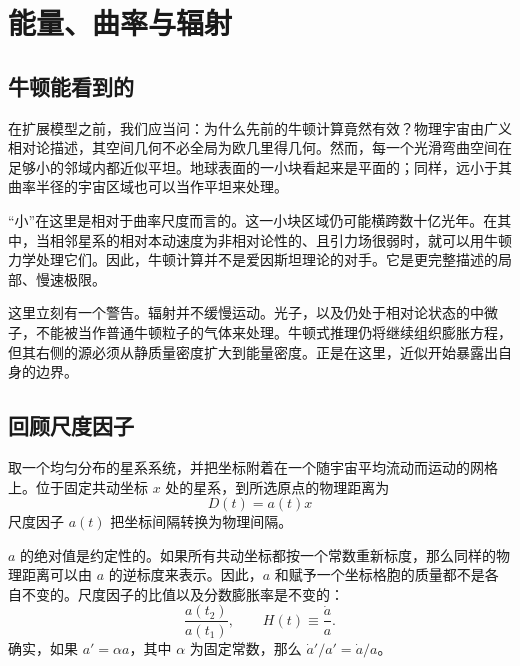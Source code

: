 \chapter{能量、曲率与辐射}


\section{牛顿能看到的}

在扩展模型之前，我们应当问：为什么先前的牛顿计算竟然有效？物理宇宙由广义相对论描述，其空间几何不必全局为欧几里得几何。然而，每一个光滑弯曲空间在足够小的邻域内都近似平坦。地球表面的一小块看起来是平面的；同样，远小于其曲率半径的宇宙区域也可以当作平坦来处理。

``小''在这里是相对于曲率尺度而言的。这一小块区域仍可能横跨数十亿光年。在其中，当相邻星系的相对本动速度为非相对论性的、且引力场很弱时，就可以用牛顿力学处理它们。因此，牛顿计算并不是爱因斯坦理论的对手。它是更完整描述的局部、慢速极限。

这里立刻有一个警告。辐射并不缓慢运动。光子，以及仍处于相对论状态的中微子，不能被当作普通牛顿粒子的气体来处理。牛顿式推理仍将继续组织膨胀方程，但其右侧的源必须从静质量密度扩大到能量密度。正是在这里，近似开始暴露出自身的边界。

\section{回顾尺度因子}

取一个均匀分布的星系系统，并把坐标附着在一个随宇宙平均流动而运动的网格上。位于固定共动坐标 \(x\) 处的星系，到所选原点的物理距离为
\begin{equation}
D(t)=a(t)x
\label{eq:c02-distance}
\end{equation}
尺度因子 \(a(t)\) 把坐标间隔转换为物理间隔。

\(a\) 的绝对值是约定性的。如果所有共动坐标都按一个常数重新标度，那么同样的物理距离可以由 \(a\) 的逆标度来表示。因此，\(a\) 和赋予一个坐标格胞的质量都不是各自不变的。尺度因子的比值以及分数膨胀率是不变的：
\begin{equation}
\frac{a(t_2)}{a(t_1)},
\qquad
H(t)\equiv\frac{\dot a}{a}.
\label{eq:c02-hubble}
\end{equation}
确实，如果 \(a'=\alpha a\)，其中 \(\alpha\) 为固定常数，那么 \(\dot a'/a'=\dot a/a\)。

